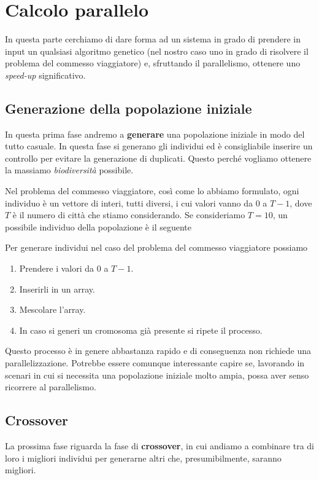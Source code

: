 \section{Calcolo parallelo}

In questa parte cerchiamo di dare forma ad un sistema in grado di prendere
in input un qualsiasi algoritmo genetico (nel nostro caso uno in grado di
risolvere il problema del commesso viaggiatore) e, sfruttando il parallelismo,
ottenere uno \emph{speed-up} significativo.

\subsection{Generazione della popolazione iniziale}

In questa prima fase andremo a \textbf{generare} una popolazione iniziale in
modo del tutto casuale. In questa fase si generano gli individui ed è
consigliabile inserire un controllo per evitare la generazione di duplicati.
Questo perché vogliamo ottenere la massiamo \emph{biodiversità} possibile.

Nel problema del commesso viaggiatore, così come lo abbiamo formulato, ogni
individuo è un vettore di interi, tutti diversi, i cui valori vanno da $0$ a
$T-1$, dove $T$ è il numero di città che stiamo considerando. Se consideriamo
$T = 10$, un possibile individuo della popolazione è il seguente
\begin{center}
	
\end{center}
Per generare individui nel caso del problema del commesso viaggiatore possiamo
\begin{enumerate}
	\item Prendere i valori da $0$ a $T-1$.
	\item Inserirli in un array.
	\item Mescolare l'array.
	\item In caso si generi un cromosoma già presente si ripete il processo.
\end{enumerate}
Questo processo è in genere abbastanza rapido e di conseguenza non richiede
una parallelizzazione. Potrebbe essere comunque interessante capire se,
lavorando in scenari in cui si necessita una popolazione iniziale molto ampia,
possa aver senso ricorrere al parallelismo.

\subsection{Crossover}

La prossima fase riguarda la fase di \textbf{crossover}, in cui andiamo a
combinare tra di loro i migliori individui per generarne altri che,
presumibilmente, saranno migliori.